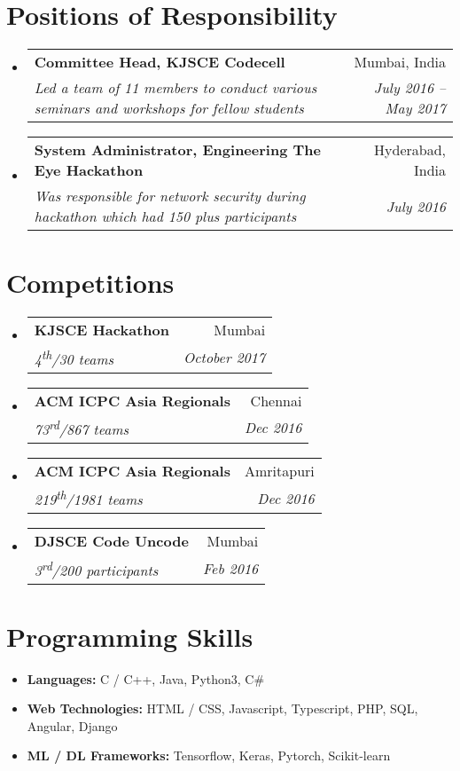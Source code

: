 \documentclass[letterpaper,8pt]{article}
\makeatletter
\newcommand{\resumeSubheading}[4]{
  \vspace{-1pt}\item
    \begin{tabular*}{0.97\textwidth}{l@{\extracolsep{\fill}}r}
      \textbf{#1} & #2 \\
      \textit{\small#3} & \textit{\small #4} \\
    \end{tabular*}\vspace{-5pt}
}
\newcommand{\resumeSubHeadingListStart}{\begin{itemize}[leftmargin=*]}
\newcommand{\resumeSubHeadingListEnd}{\end{itemize}}
\makeatother
\begin{document}
\section{Positions of Responsibility}
  \resumeSubHeadingListStart
    \resumeSubheading
      {Committee Head, KJSCE Codecell}{Mumbai, India}
      {Led a team of 11 members to conduct various seminars and workshops for fellow students}{July 2016 -- May 2017}
    \resumeSubheading
      {System Administrator, Engineering The Eye Hackathon}{Hyderabad, India}
      {Was responsible for network security during hackathon which had 150 plus participants}{July 2016}
  \resumeSubHeadingListEnd
  
\section{Competitions}
  \resumeSubHeadingListStart
  	\resumeSubheading{KJSCE Hackathon}{Mumbai}{4\textsuperscript{th}/30 teams}{October 2017}
    \resumeSubheading{ACM ICPC Asia Regionals}{Chennai}{73\textsuperscript{rd}/867 teams}{Dec 2016}
    \resumeSubheading{ACM ICPC Asia Regionals}{Amritapuri}{219\textsuperscript{th}/1981 teams}{Dec 2016}
    \resumeSubheading{DJSCE Code Uncode}{Mumbai}{3\textsuperscript{rd}/200 participants}{Feb 2016}
  \resumeSubHeadingListEnd

\section{Programming Skills}
  \resumeSubHeadingListStart
    \item{
      \textbf{Languages}{\textbf{:} C / C++, Java, Python3, C\#}
      \hfill
    }
    \vspace{-4pt}
    \item{
      \textbf{Web Technologies}{\textbf{:} HTML / CSS, Javascript, Typescript, PHP, SQL, Angular, Django}
      \hfill
    }
    \vspace{-4pt}
    \item{
      \textbf{ML / DL Frameworks}{\textbf{:} Tensorflow, Keras, Pytorch, Scikit-learn}
      \hfill
    }
  \resumeSubHeadingListEnd
\end{document}
